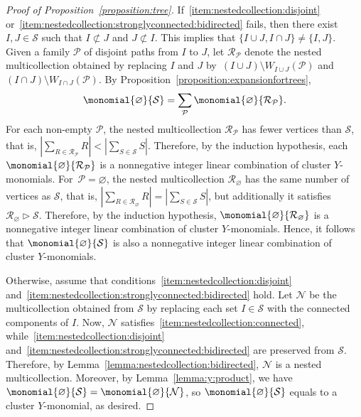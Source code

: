 \begin{proof}[Proof of Proposition~\ref{proposition:tree}]
    If~\ref{item:nestedcollection:disjoint} or~\ref{item:nestedcollection:stronglyconnected:bidirected} fails,
    then there exist \(I, J \in \mathcal{S}\)
    such that \(I \not\subset J\) and \(J \not\subset I\).
    This implies that \(\{I \cup J, I \cap J\} \neq \{I, J\}\).
    Given a family \(\mathcal{P}\) of disjoint paths from \(I\) to \(J\),
    let \(\mathcal{R}_{\mathcal{P}}\) denote the nested multicollection obtained by replacing \(I\) and \(J\) by~\((I \cup J) \setminus W_{I \cup J}(\mathcal{P})\) and \((I \cap J) \setminus W_{I \cap J}(\mathcal{P})\).
    By Proposition~\ref{proposition:expansionfortrees},
    \begin{equation*}
        \monomial{\varnothing}{\mathcal{S}}
        =
        \sum_{\mathcal{P}} \monomial{\varnothing}{\mathcal{R}_{\mathcal{P}}}.
    \end{equation*}
    For each non-empty \(\mathcal{P}\), the nested multicollection \(\mathcal{R}_{\mathcal{P}}\) has fewer vertices than \(\mathcal{S}\),
    that is, \(\left|\sum_{R \in \mathcal{R}_{\mathcal{P}}} R\right| < \left|\sum_{S \in \mathcal{S}} S\right|\).
    Therefore, by the induction hypothesis, each \(\monomial{\varnothing}{\mathcal{R}_{\mathcal{P}}}\) is a nonnegative integer linear combination of cluster \(Y\)-monomials.
    For~\(\mathcal{P} = \varnothing\), the nested multicollection \(\mathcal{R}_{\varnothing}\) has the same number of vertices as \(\mathcal{S}\),
    that is, \mbox{\(\left|\sum_{R \in \mathcal{R}_{\varnothing}} R\right| = \left|\sum_{S \in \mathcal{S}} S\right|\)},
    but additionally it satisfies \(\mathcal{R}_{\varnothing} \triangleright \mathcal{S}\).
    Therefore, by the induction hypothesis, \(\monomial{\varnothing}{\mathcal{R}_{\varnothing}}\) is a nonnegative integer linear combination of cluster \(Y\)-monomials.
    Hence, it follows that \(\monomial{\varnothing}{\mathcal{S}}\) is also a nonnegative integer linear combination of cluster \(Y\)-monomials.

    Otherwise, assume that conditions~\ref{item:nestedcollection:disjoint} and~\ref{item:nestedcollection:stronglyconnected:bidirected} hold.
    Let \(\mathcal{N}\) be the multicollection
    obtained from \(\mathcal{S}\) by replacing each set \(I \in \mathcal{S}\) with the connected components of \(I\).
    Now, \(\mathcal{N}\) satisfies~\ref{item:nestedcollection:connected},
    while~\ref{item:nestedcollection:disjoint} and~\ref{item:nestedcollection:stronglyconnected:bidirected} are preserved from \(\mathcal{S}\).
    Therefore,
    by Lemma~\ref{lemma:nestedcollection:bidirected},
    \(\mathcal{N}\) is a nested multicollection.
    Moreover, by Lemma~\ref{lemma:y:product}, we have \(\monomial{\varnothing}{\mathcal{S}} = \monomial{\varnothing}{\mathcal{N}}\),
    so \(\monomial{\varnothing}{\mathcal{S}}\) equals to a cluster \(Y\)-monomial, as desired.
\end{proof}

